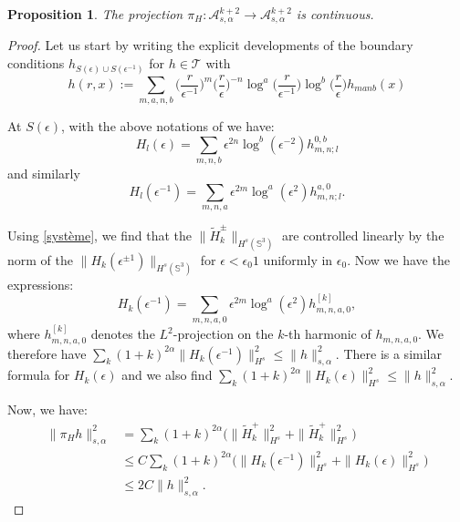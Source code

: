 \documentclass[12pt]{article}
\newtheorem{prop}[thm]{Proposition}
\newcommand{\calA}{{\mathcal A}}
\begin{document}
    \begin{prop}
        The projection $\pi_H: \calA^{k+2}_{s,\alpha}\to \calA^{k+2}_{s,\alpha}$ is continuous.
    \end{prop}
    \begin{proof}
        Let us start by writing the explicit developments of the boundary conditions $h_{S(\epsilon)\cup S(\epsilon^{-1})}$ for $h\in \mathcal{T}$ with
        $$h(r,x):=\sum_{m,a,n,b}\Big(\frac{r}{\epsilon^{-1}}\Big)^{m}\Big(\frac{r}{\epsilon}\Big)^{-n}\log^a\Big(\frac{r}{\epsilon^{-1}}\Big)\log^b\Big(\frac{r}{\epsilon}\Big) h_{manb}(x) $$
        
        At $S(\epsilon)$, with the above notations of we have: 
        \begin{equation}
            H_l(\epsilon) = \sum_{m,n,b}\epsilon ^{2n}\log^b(\epsilon^{-2}) h_{m,n;l}^{0,b}\label{Hepsilon}
        \end{equation}
        and similarly
        \begin{equation}
            H_l(\epsilon^{-1}) = \sum_{m,n,a}\epsilon^{2m}\log^a(\epsilon^{2}) h_{m,n;l}^{a,0}.\label{Hepsilon-}
        \end{equation}
        
        Using  \eqref{système}, we find that the $\|\tilde{H}_{k}^\pm\|_{H^s(\mathbb{S}^3)}$ are controlled linearly by the norm of the $\|H_k(\epsilon^{\pm 1})\|_{H^s(\mathbb{S}^3)}$ for $\epsilon < \epsilon_0 1$ uniformly in $\epsilon_0$. Now we have the expressions:
        $$ H_k(\epsilon^{-1}) = \sum_{m,n,a,0}\epsilon^{2m}\log^a(\epsilon^{2})h_{m,n,a,0}^{[k]},$$
        where $h_{m,n,a,0}^{[k]}$ denotes the $L^2$-projection on the $k$-th harmonic of $h_{m,n,a,0}$. We therefore have $\sum_k(1+k)^{2\alpha}\|H_k(\epsilon^{-1})\|^2_{H^s}\leqslant \|h\|_{s,\alpha}^2$. There is a similar formula for $H_k(\epsilon)$ and we also find $\sum_k(1+k)^{2\alpha}\|H_k(\epsilon)\|^2_{H^s}\leqslant \|h\|_{s,\alpha}^2$.
         
        Now, we have:
        \begin{align*}
            \|\pi_{H}h\|^2_{s,\alpha} &= \sum_{k}(1+k)^{2\alpha}\Big(\|\tilde{H}_{k}^+\|^2_{H^s}+\|\tilde{H}_{k}^+\|^2_{H^s}\Big)\\
            &\leqslant C \sum_{k}(1+k)^{2\alpha}\Big(\|H_k(\epsilon^{-1})\|^2_{H^s}+\|H_k(\epsilon)\|^2_{H^s}\Big)\\
            &\leqslant 2C\|h\|_{s,\alpha}^2.
        \end{align*}
    \end{proof}
    
\end{document}

